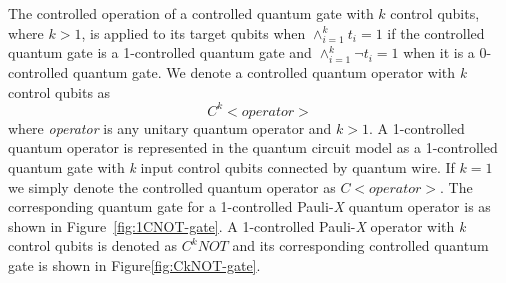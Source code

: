 The controlled operation of a controlled quantum gate with $k$ control qubits, where $k > 1$, is applied to its target qubits when $\wedge_{i=1}^{k} t_i = 1$ if the controlled quantum gate is a 1-controlled quantum gate and $\wedge_{i=1}^{k} \neg t_i = 1$ when it is a 0-controlled quantum gate. We denote a controlled quantum operator with \textit{k} control qubits as
\[
C^{k}< operator >
\]
where \textit{operator} is any unitary quantum operator and $k > 1$. A 1-controlled quantum operator is represented in the quantum circuit model as a 1-controlled quantum gate with \textit{k} input control qubits connected by quantum wire. If $k = 1$ we simply denote the controlled quantum operator as $C< operator >$. The corresponding quantum gate for a 1-controlled Pauli-\textit{X} quantum operator is as shown in Figure~\ref{fig:1CNOT-gate}. A 1-controlled Pauli-\textit{X} operator with \textit{k} control qubits is denoted as $C^{k}NOT$ and its corresponding controlled quantum gate is shown in Figure\ref{fig:CkNOT-gate}.


